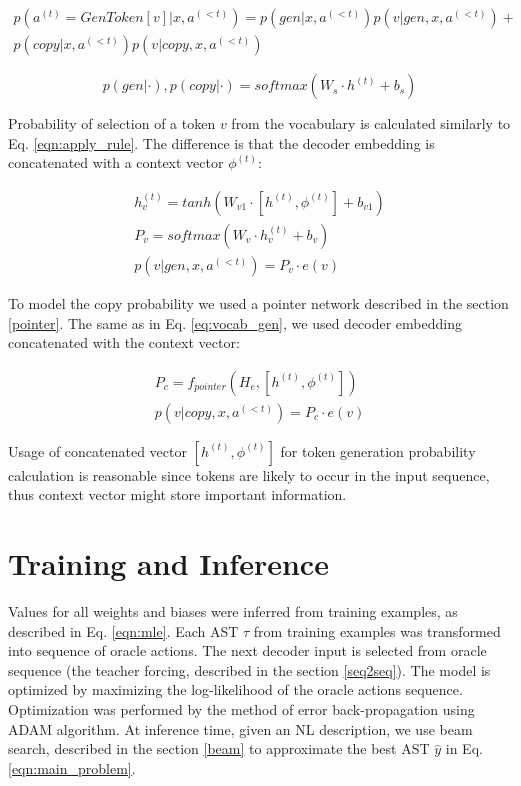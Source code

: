 \begin{equation}
\begin{gathered}
    p(a^{(t)} = GenToken[v]|x,a^{(<t)}) = p(gen|x, a^{(<t)}) p(v|gen, x, a^{(<t)}) + \\
    p(copy|x, a^{(<t)}) p(v|copy, x, a^{(<t)})
\end{gathered}
\end{equation}

\begin{equation}
    p(gen|\cdot), p(copy|\cdot) = softmax(W_s\cdot h^{(t)} + b_s)
\end{equation}

Probability of selection of a token $v$ from the vocabulary is calculated similarly to Eq. \ref{eqn:apply_rule}. The difference is that the decoder embedding is concatenated with a context vector $\phi^{(t)}$:

\begin{equation}
\begin{gathered}
    h^{(t)}_v = tanh(W _{v1}\cdot [h^{(t)}, \phi^{(t)}] + b_{v1}) \\
    P_v = softmax(W_v\cdot h^{(t)}_v  + b_v) \\
    p(v|gen, x, a^{(<t)}) = P_v\cdot e(v)
\end{gathered}
\label{eq:vocab_gen}
\end{equation}

To model the copy probability we used a pointer network \parencite{Vinyals2015} described in the section \ref{pointer}. The same as in Eq. \ref{eq:vocab_gen}, we used decoder embedding concatenated with the context vector:

\begin{equation}
\begin{gathered}
    P_c = f_{pointer}(H_e, [h^{(t)}, \phi^{(t)}]) \\
    p(v|copy, x, a^{(<t)}) = P_c \cdot e(v)
\end{gathered}
\end{equation}

Usage of concatenated vector $[h^{(t)}, \phi^{(t)}]$ for token generation probability calculation is reasonable since tokens are likely to occur in the input sequence, thus context vector might store important information.

\section{Training and Inference}

Values for all weights and biases were inferred from training examples, as described in Eq. \ref{eqn:mle}. Each AST $\tau$ from training examples was transformed into sequence of oracle actions. The next decoder input is selected from oracle sequence (the teacher forcing, described in the section \ref{seq2seq}). The model is optimized by maximizing the log-likelihood of the oracle actions sequence. Optimization was performed by the method of error back-propagation using ADAM \parencite{Kingma2014} algorithm. At inference time, given an NL description, we use beam search, described in the section \ref{beam} to approximate the best AST $\hat{y}$ in Eq. \ref{eqn:main_problem}.



